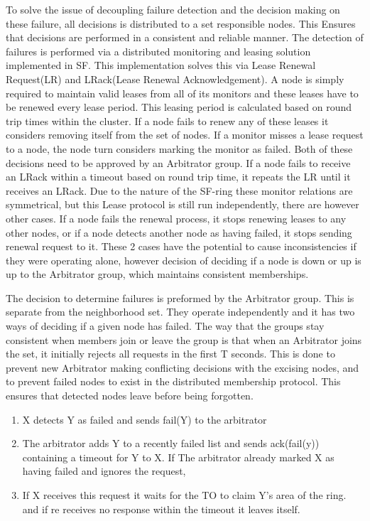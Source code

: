 \documentclass[a4paper,10pt,titlepage]{report}
\begin{document}
    To solve the issue of decoupling failure detection and the decision making on these failure, all decisions is distributed to a set responsible nodes. This Ensures that decisions are performed in a consistent and reliable manner. The detection of failures is performed via a distributed monitoring and leasing solution implemented in SF. This implementation solves this via Lease Renewal Request(LR) and LRack(Lease Renewal Acknowledgement). A node is simply required to maintain valid leases from all of its monitors and these leases have to be renewed every lease period. This leasing period is calculated based on round trip times within the cluster. If a node fails to renew any of these leases it considers removing itself from the set of nodes. If a monitor misses a lease request to a node, the node turn considers marking the monitor as failed. Both of these decisions need to be approved by an Arbitrator group. If a node fails to receive an LRack within a timeout based on round trip time, it repeats the LR until it receives an LRack. Due to the nature of the SF-ring these monitor relations are symmetrical, but this Lease protocol is still run independently, there are however other cases. If a node fails the renewal process, it stops renewing leases to any other nodes, or if a node detects another node as having failed, it stops sending renewal request to it. These 2 cases have the potential to cause inconsistencies if they were operating alone, however decision of deciding if a node is down or up is up to the Arbitrator group, which maintains consistent memberships. \\
    \vspace{5mm}

    The decision to determine failures is preformed by the Arbitrator group. This is separate from the neighborhood set. They operate independently and it has two ways of deciding if a given node has failed. The way that the groups stay consistent when members join or leave the group is that when an Arbitrator joins the set, it initially rejects all requests in the first T seconds. This is done to prevent new Arbitrator making conflicting decisions with the excising nodes, and to prevent failed nodes to exist in the distributed membership protocol. This ensures that detected nodes leave before being forgotten.\\
    \vspace{5mm}

    \begin{enumerate}
        \item X detects Y as failed and sends fail(Y) to the arbitrator
        \item The arbitrator adds Y to a recently failed list and sends ack(fail(y)) containing a timeout for Y to X. If The arbitrator already marked X as having failed and ignores the request,
        \item If X receives this request it waits for the TO to claim Y's area of the ring. and if re receives no response within the timeout it leaves itself.
    \end{enumerate}
\end{document}
